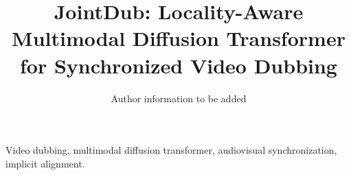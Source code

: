 \documentclass[letterpaper,journal]{IEEEtran}
\begin{document}
\title{JointDub: Locality-Aware Multimodal Diffusion Transformer for Synchronized Video Dubbing}
\author{Author information to be added}
\maketitle



\begin{IEEEkeywords}
Video dubbing, multimodal diffusion transformer, audiovisual synchronization,
implicit alignment.
\end{IEEEkeywords}










\end{document}
